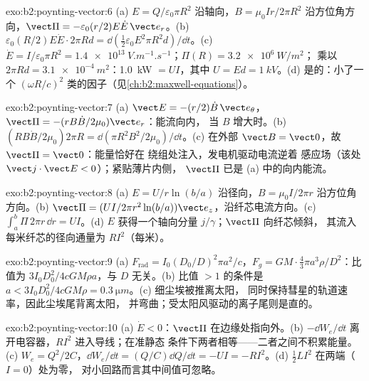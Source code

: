 \begin{solution}{exo:b2:poynting-vector:6}
(a) $E = Q/\varepsilon_0\pi R^2$ 沿轴向，$B = \mu_0Ir/2\pi R^2$ 沿方位角方向，$\vect\Pi = -\varepsilon_0
(r/2)E\dot E\,\vect e_r$。(b) $\varepsilon_0(R/2)E\dot E\cdot2\pi Rd = \dd(\tfrac12\varepsilon_0E^2\pi R^2d)/
\dd t$。(c) $\dot E = I/\varepsilon_0\pi R^2 = \qty{1.4e13}{V.m^{-1}.s^{-1}}$；$\Pi(R) = \qty{3.2e6}{W/m^2}$；
乘以 $2\pi Rd = \qty{3.1e-4}{m^2}$：\qty{1.0}{kW} $= UI$，其中 $U = Ed = \qty{1}{kV}$。(d)
是的：小了一个 $(\omega R/c)^2$ 类的因子（见\cref{ch:b2:maxwell-equations}）。
\end{solution}

\begin{solution}{exo:b2:poynting-vector:7}
(a) $\vect E = -(r/2)\dot B\,\vect e_\theta$，$\vect\Pi = -(rB\dot B/2\mu_0)\vect e_r$：能流向内，
当 $B$ 增大时。(b) $(RB\dot B/2\mu_0)2\pi R = \dd(\pi R^2B^2/2\mu_0)/\dd t$。(c)
在外部 $\vect B = \vect 0$，故 $\vect\Pi = \vect 0$：能量恰好在
绕组处注入，发电机驱动电流逆着
感应场（该处 $\vect j\cdot\vect E < 0$）；紧贴薄片内侧，
$\vect\Pi$ 已是 (a) 中的向内能流。
\end{solution}

\begin{solution}{exo:b2:poynting-vector:8}
(a) $E = U/r\ln(b/a)$ 沿径向，$B = \mu_0I/2\pi r$ 沿方位角方向。(b) $\vect\Pi = (UI/
2\pi r^2\ln(b/a))\vect e_z$，沿纤芯电流方向。(c) $\int_a^b\Pi\,2\pi r\,\dd r =
UI$。(d) $E$ 获得一个轴向分量 $j/\gamma$；$\vect\Pi$ 向纤芯倾斜，
其流入每米纤芯的径向通量为 $RI^2$（每米）。
\end{solution}

\begin{solution}{exo:b2:poynting-vector:9}
(a) $F_{\text{rad}} = I_0(D_0/D)^2\pi a^2/c$，$F_g = GM\cdot\tfrac43\pi a^3\rho/D^2$：比值为
$3I_0D_0^2/4cGM\rho a$，与 $D$ 无关。(b) 比值 $> 1$ 的条件是 $a < 3I_0D_0^2/
4cGM\rho = \qty{0.3}{\micro m}$。(c) 细尘埃被推离太阳，
同时保持彗星的轨道速率，因此尘埃尾背离太阳，
并弯曲；受太阳风驱动的离子尾则是直的。
\end{solution}

\begin{solution}{exo:b2:poynting-vector:10}
(a) $\dot E < 0$：$\vect\Pi$ 在边缘处指向外。(b) $-\dd W_e/\dd t$
离开电容器，$RI^2$ 进入导线；在准静态
条件下两者相等——二者之间不积累能量。(c) $W_e =
Q^2/2C$，$\dd W_e/\dd t = (Q/C)\dd Q/\dd t = -UI = -RI^2$。(d) $\tfrac12LI^2$
在两端（$I = 0$）处为零，
对小回路而言其中间值可忽略。
\end{solution}

